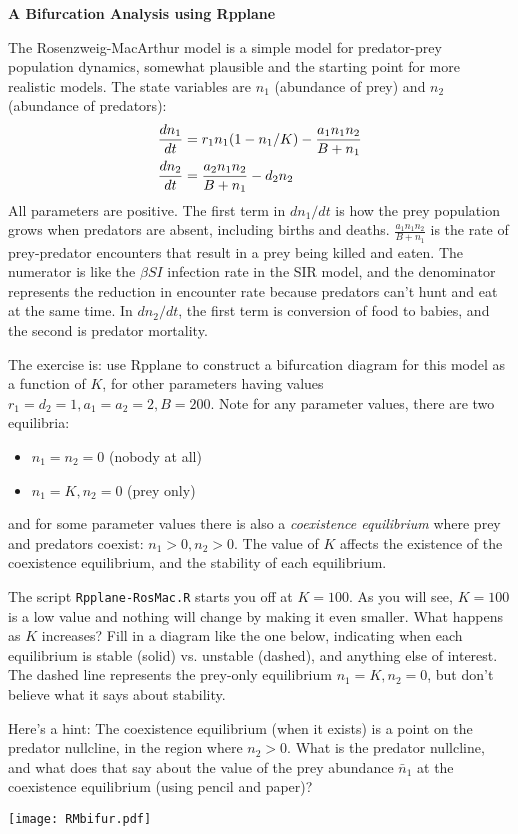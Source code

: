 \documentclass [11pt]{article}
\begin{document}
\centerline{\textbf{A Bifurcation Analysis using Rpplane}}

The Rosenzweig-MacArthur model is a simple model for
predator-prey population dynamics, somewhat plausible and 
the starting point for more realistic models. The state
variables are $n_1$ (abundance of prey) and $n_2$ (abundance of predators):   
\begin{equation}
\begin{gathered}
  \frac{dn_1}{dt} = r_1 n_1 (1 - n_1 /K ) - \frac{a_1 n_1 n_2}{B + n_1} \hfill \\ 
  \frac{dn_2}{dt} = \frac{a_2 n_1 n_2}{B + n_1} - d_2 n_2 \hfill  \\ 
\end{gathered}
\label{RosMacModel} 
\end{equation}
All parameters are positive. The first term in $dn_1/dt$ is how the prey population grows when predators are absent,  
including births and deaths. $\frac{a_1 n_1 n_2}{B+n_1}$ is the rate of prey-predator encounters that result 
in a prey being killed and eaten. The numerator is like the $\beta SI$ infection rate
in the SIR model, and the denominator represents 
the reduction in encounter rate because predators can't hunt and eat at the same time. 
In $dn_2/dt$, the first term is conversion of food to babies, and the second is predator mortality. 

The exercise is: use Rpplane to construct a bifurcation diagram for this model as a function of $K$, for other
parameters having values $r_1=d_2=1, a_1 = a_2 = 2, B=200$. Note for any parameter values, there are two equilibria: 
\begin{itemize}
\item $n_1 = n_2 = 0$ (nobody at all) 
\item $n_1 = K, n_2 = 0$ (prey only) 
\end{itemize} 
and for some parameter values there is also a \emph{coexistence equilibrium} 
where prey and predators coexist: $n_1 >0, n_2 >0$. The value of $K$ 
affects the existence of the coexistence equilibrium, and the stability of each equilibrium. 

The script \texttt{Rpplane-RosMac.R} starts you off at $K=100$. As you will see, $K=100$ is a low value and
nothing will change by making it even smaller. What happens as $K$ increases? Fill in a diagram like the one below, 
indicating when each equilibrium is stable (solid) vs. unstable (dashed), and anything else of interest. The dashed
line represents the prey-only equilibrium $n_1=K, n_2=0$, but don't believe what it says about stability. 

Here's a hint: The coexistence equilibrium (when it exists) is a point on the predator nullcline, in the region where $n_2 > 0$. 
What is the predator nullcline, and what does that say about the value of the prey abundance $\bar{n}_1$ at 
the coexistence equilibrium (using pencil and paper)? 

\centerline{\texttt{[image: RMbifur.pdf]}}
\end{document}
